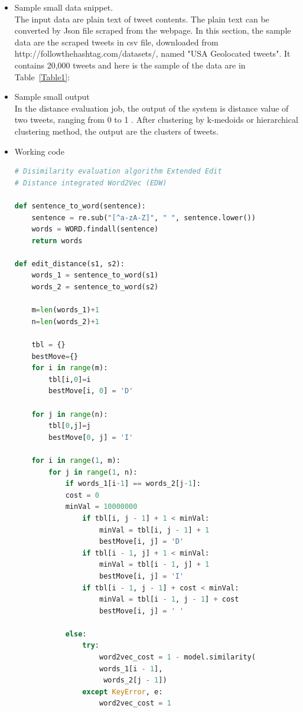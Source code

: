 \documentclass[10pt]{article}
\begin{document}
\begin{itemize} 
\item{}
Sample small data snippet. \\
The input data are plain text of tweet contents. The plain text can be converted by Json file scraped from the webpage. In this section, the sample data are the scraped tweets in csv file, downloaded from http://followthehashtag.com/datasets/, named "USA Geolocated tweets". It contains 20,000 tweets and here is the sample of the data are in Table~\ref{Table1}:


   
\item{}
Sample small output\\
In the distance evaluation job, the output of the system is distance value of two tweets, ranging from 0 to 1 . After clustering by  k-medoids or hierarchical clustering method, the output are the clusters of tweets. 
   
\item{}
Working code

\begin{lstlisting}[language=Python]
# Disimilarity evaluation algorithm Extended Edit 
# Distance integrated Word2Vec (EDW)

def sentence_to_word(sentence):
    sentence = re.sub("[^a-zA-Z]", " ", sentence.lower())
    words = WORD.findall(sentence)
    return words

def edit_distance(s1, s2):
    words_1 = sentence_to_word(s1)
    words_2 = sentence_to_word(s2)

    m=len(words_1)+1
    n=len(words_2)+1

    tbl = {} 
    bestMove={}
    for i in range(m):
	    tbl[i,0]=i
	    bestMove[i, 0] = 'D'

    for j in range(n):
        tbl[0,j]=j
        bestMove[0, j] = 'I'

    for i in range(1, m):
        for j in range(1, n):
            if words_1[i-1] == words_2[j-1]:
            cost = 0
            minVal = 10000000
                if tbl[i, j - 1] + 1 < minVal:
                    minVal = tbl[i, j - 1] + 1
                    bestMove[i, j] = 'D'
                if tbl[i - 1, j] + 1 < minVal:
                    minVal = tbl[i - 1, j] + 1
                    bestMove[i, j] = 'I'
                if tbl[i - 1, j - 1] + cost < minVal:
                    minVal = tbl[i - 1, j - 1] + cost
                    bestMove[i, j] = ' ' 

            else:
                try:
                    word2vec_cost = 1 - model.similarity(
                    words_1[i - 1],
                     words_2[j - 1])
                except KeyError, e:
                    word2vec_cost = 1  


\end{lstlisting}
\end{itemize}
\end{document}
